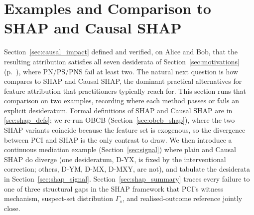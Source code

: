 \section{Examples and Comparison to SHAP and Causal SHAP}\label{sec:shap_examples}

 Section~\ref{sec:causal_impact} defined \ourapproach
and verified, on Alice and Bob, that the resulting attribution satisfies all seven
desiderata of Section~\ref{sec:motivations} (p.~\pageref{desid}), where PN/PS/PNS
fail at least two. The natural next
question is how \ourapproach compares to SHAP and Causal SHAP, the dominant
practical alternatives for feature attribution that practitioners typically
reach for. This section runs that comparison
on two examples, recording where each method passes or fails an explicit
desideratum. Formal definitions of SHAP and Causal SHAP are in \cref{sec:shap_defs}; we re-run OBCB
(Section~\ref{sec:obcb_shap}), where the two SHAP variants coincide because the
feature set is exogenous, so the divergence between PCI and SHAP is the only
contrast to draw. We then introduce a continuous mediation example
(Section~\ref{sec:signal}) where plain and Causal SHAP do diverge (one
desideratum, D-YX, is fixed by the interventional correction; others, D-YM,
D-MX, D-MXY, are not), and tabulate the desiderata in
Section~\ref{sec:shap_signal}. Section~\ref{sec:shap_summary} traces every
failure to one of three structural gaps in the SHAP framework that PCI's witness
mechanism, suspect-set distribution $\Gamma_s$, and realised-outcome reference
jointly close.

